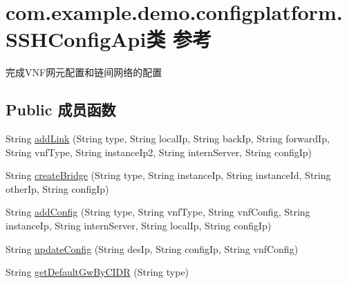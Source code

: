 \hypertarget{classcom_1_1example_1_1demo_1_1configplatform_1_1_s_s_h_config_api}{}\section{com.\+example.\+demo.\+configplatform.\+S\+S\+H\+Config\+Api类 参考}
\label{classcom_1_1example_1_1demo_1_1configplatform_1_1_s_s_h_config_api}


完成\+V\+N\+F网元配置和链间网络的配置  


\subsection*{Public 成员函数}
\begin{DoxyCompactItemize}
\item 
String \mbox{\hyperlink{classcom_1_1example_1_1demo_1_1configplatform_1_1_s_s_h_config_api_ae4d684c6d24bf9e98069f0fd9819e081}{add\+Link}} (String type, String local\+Ip, String back\+Ip, String forward\+Ip, String vnf\+Type, String instance\+Ip2, String intern\+Server, String config\+Ip)
\item 
String \mbox{\hyperlink{classcom_1_1example_1_1demo_1_1configplatform_1_1_s_s_h_config_api_a1126d2800e64cbc6327971bb190de82b}{create\+Bridge}} (String type, String instance\+Ip, String instance\+Id, String other\+Ip, String config\+Ip)
\item 
String \mbox{\hyperlink{classcom_1_1example_1_1demo_1_1configplatform_1_1_s_s_h_config_api_abeccd15f19b2d50b39382aee0b2b49cd}{add\+Config}} (String type, String vnf\+Type, String vnf\+Config, String instance\+Ip, String intern\+Server, String local\+Ip, String config\+Ip)
\item 
String \mbox{\hyperlink{classcom_1_1example_1_1demo_1_1configplatform_1_1_s_s_h_config_api_a32430559f66a03010ef0701b3f8a8559}{update\+Config}} (String des\+Ip, String config\+Ip, String vnf\+Config)
\item 
String \mbox{\hyperlink{classcom_1_1example_1_1demo_1_1configplatform_1_1_s_s_h_config_api_a21ce0c13a9bcdf854dcff73722178b66}{get\+Default\+Gw\+By\+C\+I\+DR}} (String type)
\end{DoxyCompactItemize}
